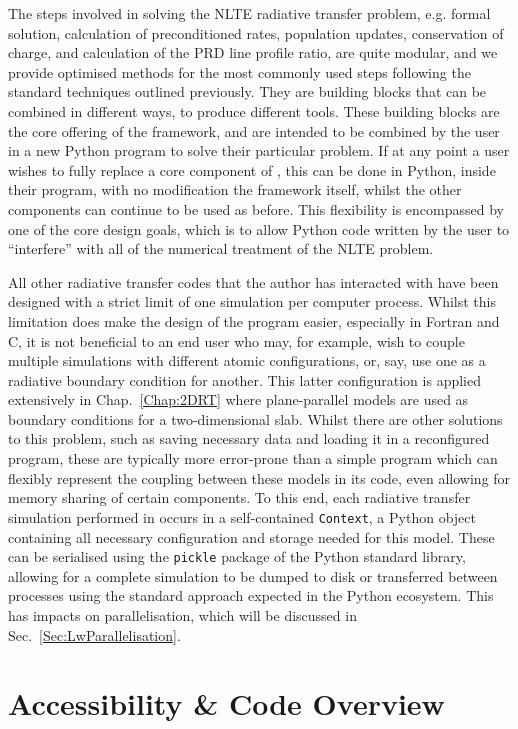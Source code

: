 The steps involved in solving the NLTE radiative transfer problem, e.g. formal solution, calculation of preconditioned rates, population updates, conservation of charge, and calculation of the PRD line profile ratio, are quite modular, and we provide optimised methods for the most commonly used steps following the standard techniques outlined previously.
They are building blocks that can be combined in different ways, to produce different tools.
These building blocks are the core offering of the \Lw{} framework, and are intended to be combined by the user in a new Python program to solve their particular problem.
If at any point a user wishes to fully replace a core component of \Lw{}, this can be done in Python, inside their program, with no modification the framework itself, whilst the other components can continue to be used as before.
This flexibility is encompassed by one of the core design goals, which is to allow Python code written by the user to ``interfere'' with all of the numerical treatment of the NLTE problem.

All other radiative transfer codes that the author has interacted with have been designed with a strict limit of one simulation per computer process.
Whilst this limitation does make the design of the program easier, especially in Fortran and C, it is not beneficial to an end user who may, for example, wish to couple multiple simulations with different atomic configurations, or, say, use one as a radiative boundary condition for another.
This latter configuration is applied extensively in Chap.~\ref{Chap:2DRT} where plane-parallel models are used as boundary conditions for a two-dimensional slab.
Whilst there are other solutions to this problem, such as saving necessary data and loading it in a reconfigured program, these are typically more error-prone than a simple program which can flexibly represent the coupling between these models in its code, even allowing for memory sharing of certain components.
To this end, each radiative transfer simulation performed in \Lw{} occurs in a self-contained \texttt{Context}, a Python object containing all necessary configuration and storage needed for this model.
These can be serialised using the \texttt{pickle} package of the Python standard library, allowing for a complete simulation to be dumped to disk or transferred between processes using the standard approach expected in the Python ecosystem.
This has impacts on parallelisation, which will be discussed in Sec.~\ref{Sec:LwParallelisation}.

\section{Accessibility \& Code Overview}\label{Sec:LwCodeOverview}


